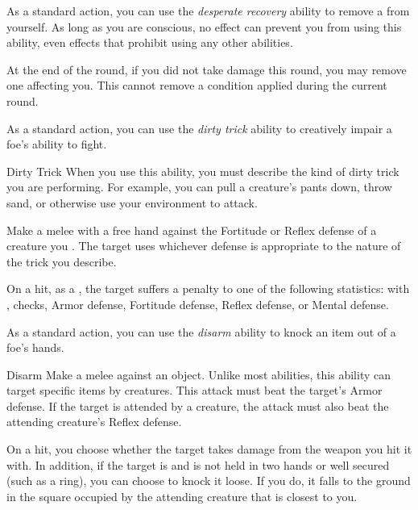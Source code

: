          As a standard action, you can use the \textit{desperate recovery} ability to remove a  from yourself.
        As long as you are conscious, no effect can prevent you from using this ability, even effects that prohibit using any other abilities.

        \begin{freeability}{}
            At the end of the round, if you did not take damage this round, you may remove one  affecting you.
            This cannot remove a condition applied during the current round.
        \end{freeability}

         As a standard action, you can use the \textit{dirty trick} ability to creatively impair a foe's ability to fight.

        \begin{freeability}{Dirty Trick}\label{Dirty Trick}
            When you use this ability, you must describe the kind of dirty trick you are performing.
            For example, you can pull a creature's pants down, throw sand, or otherwise use your environment to attack.

            Make a melee  with a free hand against the Fortitude or Reflex defense of a creature you .
            The target uses whichever defense is appropriate to the nature of the trick you describe.

            On a hit, as a , the target suffers a  penalty to one of the following statistics:
                 with ,  checks, Armor defense, Fortitude defense, Reflex defense, or Mental defense.
        \end{freeability}

         As a standard action, you can use the \textit{disarm} ability to knock an item out of a foe's hands.

        \begin{freeability}{Disarm}\label{Disarm}
            Make a melee  against an object.
            Unlike most abilities, this ability can target specific items  by creatures.
            This attack must beat the target's Armor defense.
            If the target is attended by a creature, the attack must also beat the attending creature's Reflex defense.

            On a hit, you choose whether the target takes damage from the weapon you hit it with.
            In addition, if the target is  and is not held in two hands or well secured (such as a ring), you can choose to knock it loose.
            If you do, it falls to the ground in the square occupied by the attending creature that is closest to you.
        \end{freeability}

